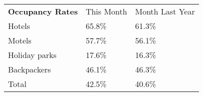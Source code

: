 \begin{tabular}[t]{p{4.5cm}>{\hfill}p{1.3cm}>{\hfill}p{1.7cm}}
 \textbf{Occupancy Rates} & This Month & Month Last Year \\ 
 Hotels & 65.8\% & 61.3\% \\ 
  Motels & 57.7\% & 56.1\% \\ 
  Holiday parks & 17.6\% & 16.3\% \\ 
  Backpackers & 46.1\% & 46.3\% \\ 
  Total & 42.5\% & 40.6\% \\ 
  \end{tabular}
